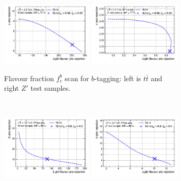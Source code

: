 \begin{figure}[h!]
  \centering
  \begin{subfigure}[b]{\textwidth}
      \centering
      \includegraphics[width=0.49\textwidth]{Images/FTAG/DL1d/extra_plots/contour_fraction_ttbar_300.pdf}
      \includegraphics[width=0.49\textwidth]{Images/FTAG/DL1d/extra_plots/contour_fraction_zp_300.pdf}
      \caption{Flavour fraction $f_c^b$ scan for $b$-tagging: left is $t\bar{t}$ and right $Z'$ test samples.} 
      \label{fig:DL1dscanfb}
  \end{subfigure}\\
  \begin{subfigure}[b]{\textwidth}
    \centering %
    \includegraphics[width=0.49\textwidth]{Images/FTAG/DL1d/extra_plots/contour_fraction_c_ttbar_299.pdf}
    \includegraphics[width=0.49\textwidth]{Images/FTAG/DL1d/extra_plots/contour_fraction_c_zp_299.pdf}

\end{subfigure}
\end{figure}
